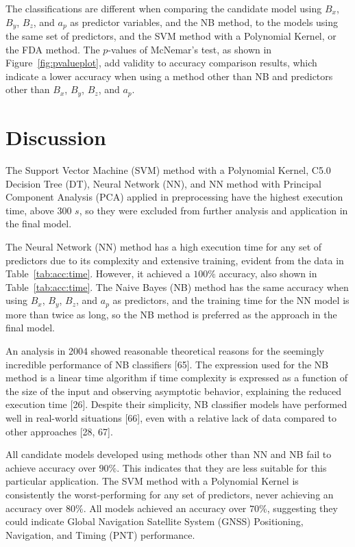 \let\LaTeXcline\cline\documentclass[sn-mathphys-num]{sn-jnl}\let\cline\LaTeXcline
\begin{document}
The classifications are different when comparing the candidate model using $B_{x}$, $B_{y}$, $B_{z}$, and $a_{p}$ as predictor variables, and the NB method, to the models using the same set of predictors, and the SVM method with a Polynomial Kernel, or the FDA method. The $p$-values of McNemar's test, as shown in Figure~\ref{fig:pvalueplot}, add validity to accuracy comparison results, which indicate a lower accuracy when using a method other than NB and predictors other than $B_{x}$, $B_{y}$, $B_{z}$, and $a_{p}$.

\section{Discussion}
\label{sec:Discussion}

The Support Vector Machine (SVM) method with a Polynomial Kernel, C5.0 Decision Tree (DT), Neural Network (NN), and NN method with Principal Component Analysis (PCA) applied in preprocessing have the highest execution time, above $300$ $s$, so they were excluded from further analysis and application in the final model.

The Neural Network (NN) method has a high execution time for any set of predictors due to its complexity and extensive training, evident from the data in Table~\ref{tab:acc:time}. However, it achieved a $100\%$ accuracy, also shown in Table~\ref{tab:acc:time}. The Naive Bayes (NB) method has the same accuracy when using $B_{x}$, $B_{y}$, $B_{z}$, and $a_{p}$ as predictors, and the training time for the NN model is more than twice as long, so the NB method is preferred as the approach in the final model.

An analysis in 2004 showed reasonable theoretical reasons for the seemingly incredible performance of NB classifiers [65]. The expression used for the NB method is a linear time algorithm if time complexity is expressed as a function of the size of the input and observing asymptotic behavior, explaining the reduced execution time [26]. Despite their simplicity, NB classifier models have performed well in real-world situations [66], even with a relative lack of data compared to other approaches [28, 67].

All candidate models developed using methods other than NN and NB fail to achieve accuracy over $90\%$. This indicates that they are less suitable for this particular application. The SVM method with a Polynomial Kernel is consistently the worst-performing for any set of predictors, never achieving an accuracy over $80\%$. All models achieved an accuracy over $70\%$, suggesting they could indicate Global Navigation Satellite System (GNSS) Positioning, Navigation, and Timing (PNT) performance.
\end{document}
